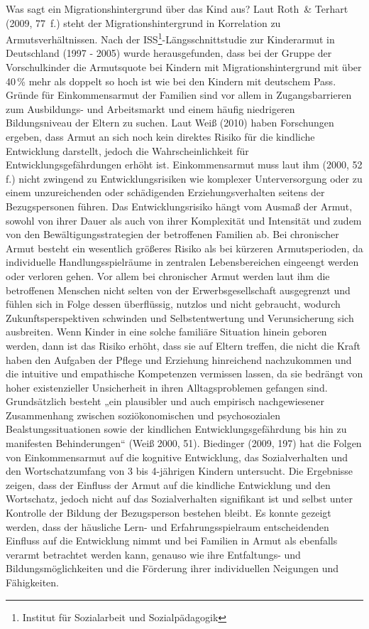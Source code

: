 Was sagt ein Migrationshintergrund über das Kind aus? Laut Roth~\& Terhart (2009, 77~f.) steht der Migrationshintergrund in Korrelation zu Armutsverhältnissen. 
Nach der ISS\footnote{Institut für Sozialarbeit und Sozialpädagogik}-Längsschnittstudie zur Kinderarmut in Deutschland (1997 - 2005) wurde herausgefunden, dass bei der Gruppe der Vorschulkinder die Armutsquote bei Kindern mit Migrationshintergrund mit über 40\,\% mehr als doppelt so hoch ist wie bei den Kindern mit deutschem Pass. Gründe für Einkommensarmut der Familien sind vor allem in Zugangsbarrieren zum Ausbildungs- und Arbeitsmarkt und einem häufig niedrigeren Bildungsniveau der Eltern zu suchen.
Laut Weiß (2010) haben Forschungen ergeben, dass Armut an sich noch kein direktes Risiko für die kindliche Entwicklung darstellt, jedoch die Wahrscheinlichkeit für Entwicklungsgefährdungen erhöht ist. 
Einkommensarmut muss laut ihm (2000, 52 f.) nicht zwingend zu Entwicklungsrisiken wie komplexer Unterversorgung oder zu einem unzureichenden oder schädigenden Erziehungsverhalten seitens der Bezugspersonen führen. Das Entwicklungsrisiko hängt vom Ausmaß der Armut, sowohl von ihrer Dauer als auch von ihrer Komplexität und Intensität und zudem von den Bewältigungsstrategien der betroffenen Familien ab. Bei chronischer Armut besteht ein wesentlich größeres Risiko als bei kürzeren Armutsperioden, da individuelle Handlungsspielräume in zentralen Lebensbereichen eingeengt werden oder verloren gehen.
Vor allem bei chronischer Armut werden laut ihm die betroffenen Menschen nicht selten von der Erwerbsgesellschaft ausgegrenzt und fühlen sich in Folge dessen überflüssig, nutzlos und nicht gebraucht, wodurch Zukunftsperspektiven schwinden und Selbstentwertung und Verunsicherung sich ausbreiten. Wenn Kinder in eine solche familiäre Situation hinein geboren werden, dann ist das Risiko erhöht, dass sie auf Eltern treffen, die nicht die Kraft haben den Aufgaben der Pflege und Erziehung hinreichend nachzukommen und die intuitive und empathische Kompetenzen vermissen lassen, da sie bedrängt von hoher existenzieller Unsicherheit in ihren Alltagsproblemen gefangen sind.   
Grundsätzlich besteht „ein plausibler und auch empirisch nachgewiesener Zusammenhang zwischen soziökonomischen und psychosozialen Bealstungssituationen sowie der kindlichen Entwicklungsgefährdung bis hin zu manifesten Behinderungen“ (Weiß 2000, 51).
Biedinger (2009, 197) hat die Folgen von Einkommensarmut auf die kognitive Entwicklung, das Sozialverhalten und den Wortschatzumfang von 3 bis 4-jährigen Kindern untersucht. Die Ergebnisse zeigen, dass der Einfluss der Armut auf die kindliche Entwicklung und den Wortschatz, jedoch nicht auf das Sozialverhalten signifikant ist und selbst unter Kontrolle der Bildung der Bezugsperson bestehen bleibt. Es konnte gezeigt werden, dass der häusliche Lern- und Erfahrungsspielraum entscheidenden Einfluss auf die Entwicklung nimmt und bei Familien in Armut als ebenfalls verarmt betrachtet werden kann, genauso wie ihre Entfaltungs- und Bildungsmöglichkeiten und die Förderung ihrer individuellen Neigungen und Fähigkeiten.
 
